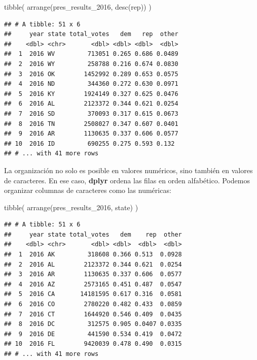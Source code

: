 \documentclass[
]{book}
\newenvironment{Shaded}{\begin{snugshade}}{\end{snugshade}}
\newcommand{\FunctionTok}[1]{\textcolor[rgb]{0.00,0.00,0.00}{#1}}
\newcommand{\NormalTok}[1]{#1}
\begin{document}
\begin{Shaded}
\begin{Highlighting}[]
\FunctionTok{tibble}\NormalTok{(}
\FunctionTok{arrange}\NormalTok{(pres\_results\_2016, }\FunctionTok{desc}\NormalTok{(rep))}
\NormalTok{)}
\end{Highlighting}
\end{Shaded}

\begin{verbatim}
## # A tibble: 51 x 6
##     year state total_votes   dem   rep  other
##    <dbl> <chr>       <dbl> <dbl> <dbl>  <dbl>
##  1  2016 WV         713051 0.265 0.686 0.0489
##  2  2016 WY         258788 0.216 0.674 0.0830
##  3  2016 OK        1452992 0.289 0.653 0.0575
##  4  2016 ND         344360 0.272 0.630 0.0971
##  5  2016 KY        1924149 0.327 0.625 0.0476
##  6  2016 AL        2123372 0.344 0.621 0.0254
##  7  2016 SD         370093 0.317 0.615 0.0673
##  8  2016 TN        2508027 0.347 0.607 0.0401
##  9  2016 AR        1130635 0.337 0.606 0.0577
## 10  2016 ID         690255 0.275 0.593 0.132 
## # ... with 41 more rows
\end{verbatim}

La organización no solo es posible en valores numéricos, sino también en valores de caracteres. En ese caso, \textbf{dplyr} ordena las filas en orden alfabético. Podemos organizar columnas de caracteres como las numéricas:

\begin{Shaded}
\begin{Highlighting}[]
\FunctionTok{tibble}\NormalTok{(}
\FunctionTok{arrange}\NormalTok{(pres\_results\_2016, state)}
\NormalTok{)}
\end{Highlighting}
\end{Shaded}

\begin{verbatim}
## # A tibble: 51 x 6
##     year state total_votes   dem    rep  other
##    <dbl> <chr>       <dbl> <dbl>  <dbl>  <dbl>
##  1  2016 AK         318608 0.366 0.513  0.0928
##  2  2016 AL        2123372 0.344 0.621  0.0254
##  3  2016 AR        1130635 0.337 0.606  0.0577
##  4  2016 AZ        2573165 0.451 0.487  0.0547
##  5  2016 CA       14181595 0.617 0.316  0.0581
##  6  2016 CO        2780220 0.482 0.433  0.0859
##  7  2016 CT        1644920 0.546 0.409  0.0435
##  8  2016 DC         312575 0.905 0.0407 0.0335
##  9  2016 DE         441590 0.534 0.419  0.0472
## 10  2016 FL        9420039 0.478 0.490  0.0315
## # ... with 41 more rows
\end{verbatim}
\end{document}
